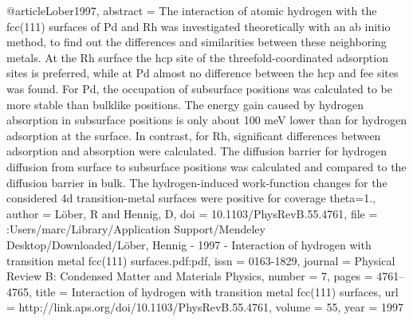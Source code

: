 @article{Lober1997,
abstract = {The interaction of atomic hydrogen with the fcc(111) surfaces of Pd and Rh was investigated theoretically with an ab initio method, to find out the differences and similarities between these neighboring metals. At the Rh surface the hcp site of the threefold-coordinated adsorption sites is preferred, while at Pd almost no difference between the hcp and fee sites was found. For Pd, the occupation of subsurface positions was calculated to be more stable than bulklike positions. The energy gain caused by hydrogen absorption in subsurface positions is only about 100 meV lower than for hydrogen adsorption at the surface. In contrast, for Rh, significant differences between adsorption and absorption were calculated. The diffusion barrier for hydrogen diffusion from surface to subsurface positions was calculated and compared to the diffusion barrier in bulk. The hydrogen-induced work-function changes for the considered 4d transition-metal surfaces were positive for coverage theta=1.},
author = {L{\"{o}}ber, R and Hennig, D},
doi = {10.1103/PhysRevB.55.4761},
file = {:Users/marc/Library/Application Support/Mendeley Desktop/Downloaded/L{\"{o}}ber, Hennig - 1997 - Interaction of hydrogen with transition metal fcc(111) surfaces.pdf:pdf},
issn = {0163-1829},
journal = {Physical Review B: Condensed Matter and Materials Physics},
number = {7},
pages = {4761--4765},
title = {{Interaction of hydrogen with transition metal fcc(111) surfaces}},
url = {http://link.aps.org/doi/10.1103/PhysRevB.55.4761},
volume = {55},
year = {1997}
}
